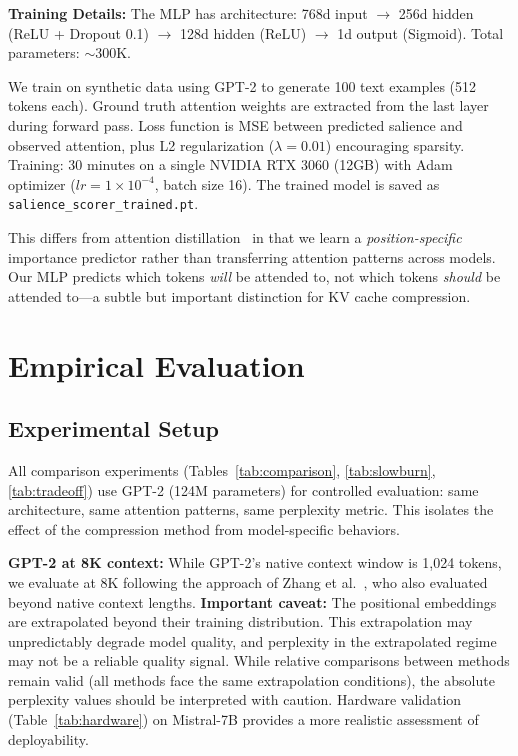 \documentclass[11pt]{article}
\begin{document}
\textbf{Training Details:} The MLP has architecture: 768d input $\rightarrow$ 256d
hidden (ReLU + Dropout 0.1) $\rightarrow$ 128d hidden (ReLU) $\rightarrow$ 1d
output (Sigmoid). Total parameters: $\sim$300K.

We train on synthetic data using GPT-2 to generate 100 text examples (512 tokens
each). Ground truth attention weights are extracted from the last layer during
forward pass. Loss function is MSE between predicted salience and observed
attention, plus L2 regularization ($\lambda=0.01$) encouraging sparsity.
Training: 30 minutes on a single NVIDIA RTX 3060 (12GB) with Adam optimizer
($lr=1\times10^{-4}$, batch size 16). The trained model is saved as
\texttt{salience\_scorer\_trained.pt}.

This differs from attention distillation~\cite{distillation} in that we learn a
\textit{position-specific} importance predictor rather than transferring attention
patterns across models. Our MLP predicts which tokens \textit{will} be attended
to, not which tokens \textit{should} be attended to---a subtle but important
distinction for KV cache compression.

\section{Empirical Evaluation}

\subsection{Experimental Setup}

All comparison experiments (Tables~\ref{tab:comparison}, \ref{tab:slowburn}, \ref{tab:tradeoff}) use GPT-2 (124M parameters) for controlled evaluation: same architecture, same attention patterns, same perplexity metric. This isolates the effect of the compression method from model-specific behaviors.

\textbf{GPT-2 at 8K context:} While GPT-2's native context window is 1,024 tokens, we evaluate at 8K following the approach of Zhang et al.~\cite{h2o}, who also evaluated beyond native context lengths. \textbf{Important caveat:} The positional embeddings are extrapolated beyond their training distribution. This extrapolation may unpredictably degrade model quality, and perplexity in the extrapolated regime may not be a reliable quality signal. While relative comparisons between methods remain valid (all methods face the same extrapolation conditions), the absolute perplexity values should be interpreted with caution. Hardware validation (Table~\ref{tab:hardware}) on Mistral-7B provides a more realistic assessment of deployability.
\end{document}
